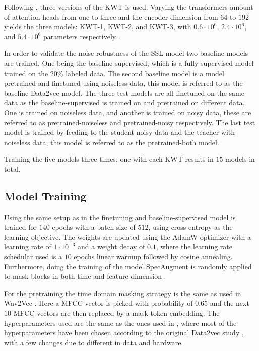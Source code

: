 Following \cite{bovbjerg2023improving}, three versions of the KWT is used. Varying the transformers amount of attention heads from one to three and the encoder dimension from \(64\) to \(192\) yields the three models: KWT-1, KWT-2, and KWT-3, with \(0.6\cdot 10^6\), \(2.4\cdot 10^6\), and \(5.4 \cdot 10^6\) parameters respectively \cite{bovbjerg2023improving}. 

In order to validate the noise-robustness of the SSL model two baseline models are trained. One being the baseline-supervised, which is a fully supervised model trained on the \(20\%\) labeled data. 
The second baseline model is a model pretrained and finetuned using noiseless data, this model is referred to as the baseline-Data2vec model. The three test models are all finetuned on the same data as the baseline-supervised is trained on and pretrained on different data. One is trained on noiseless data, and another is trained on noisy data, these are referred to as pretrained-noiseless and pretrained-noisy respectively. The last test model is trained by feeding to the student noisy data and the teacher with noiseless data, this model is referred to as the pretrained-both model. 

Training the five models three times, one with each KWT results in \(15\) models in total.


\subsection{Model Training}
Using the same setup as in \cite{bovbjerg2023improving} the finetuning and baseline-supervised model is trained for \(140\) epochs with a batch size of \(512\), using cross entropy as the learning objective. The weights are updated using the AdamW \cite{loshchilov2018fixing} optimizer with a learning rate of \(1 \cdot 10^ {-3}\) and a weight decay of \(0.1\), where the learning rate schedular used is a \(10\) epochs linear warmup followed by cosine annealing. Furthermore, doing the training of the model SpecAugment \cite{park2019specaugment} is randomly applied to mask blocks in both time and feature dimension \cite{bovbjerg2023improving}. 

For the pretraining the time domain masking strategy is the same as used in Wav2Vec \cite{}. Here a MFCC vector is picked with probability of \(0.65\) and the next \(10\) MFCC vectors are then replaced by a mask token embedding. The hyperparameters used are the same as the ones used in \cite{bovbjerg2023improving}, where most of the hyperparameters have been chosen according to the original Data2vec study \cite{baevski2022data2vec}, with a few changes due to different in data and hardware.

